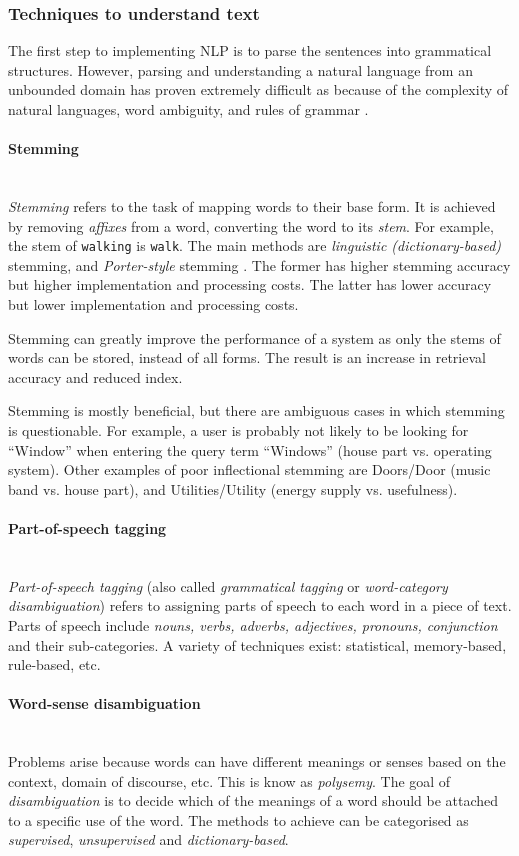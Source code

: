 \documentclass[12pt,a4paper]{article}
\newcommand{\myparagraph}[1]{\paragraph{#1}\mbox{}\\} %
\begin{document}
\subsubsection{Techniques to understand text}
The first step to implementing NLP is to parse the sentences into grammatical structures. However, parsing and understanding a natural language from an unbounded domain has proven extremely difficult as because of the complexity of natural languages, word ambiguity, and rules of grammar \cite{Martinez2010}. 

\myparagraph{Stemming}
\textit{Stemming} refers to the task of mapping words to their base form. It is achieved by removing \textit{affixes} from a word, converting the word to its \textit{stem}. For example, the stem of \texttt{walking} is \texttt{walk}. The main methods are \textit{linguistic (dictionary-based)} stemming, and \textit{Porter-style} stemming \cite{Porter1980}. The former has higher stemming accuracy but higher implementation and processing costs. The latter has lower accuracy but lower implementation and processing costs.

Stemming can greatly improve the performance of a system as only the stems of words can be stored, instead of all forms. The result is an increase in retrieval accuracy and reduced index.

Stemming is mostly beneficial, but there are ambiguous cases in which stemming is questionable. For example, a user is probably not likely to be looking for “Window” when entering the query term “Windows” (house part vs. operating system). Other examples
of poor inflectional stemming are Doors/Door (music band vs. house part), and Utilities/Utility (energy supply vs. usefulness).

\myparagraph{Part-of-speech tagging}
\textit{Part-of-speech tagging} (also called \textit{grammatical tagging} or \textit{word-category disambiguation}) refers to assigning parts of speech to each word in a piece of text. Parts of speech include \textit{nouns, verbs, adverbs, adjectives, pronouns, conjunction} and their sub-categories. A variety of techniques exist: statistical, memory-based, rule-based, etc.

\myparagraph{Word-sense disambiguation}
Problems arise because words can have different meanings or senses based on the context, domain of discourse, etc. This is know as \textit{polysemy}. The goal of \textit{disambiguation} is to decide which of the meanings of a word should be attached to a specific use of the word. The methods to achieve can be categorised as \textit{supervised}, \textit{unsupervised} and \textit{dictionary-based}. 
\end{document}
